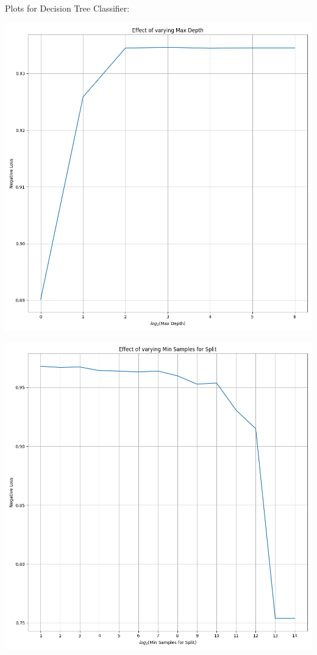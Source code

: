 \documentclass[12pt, letterpaper]{article}
\begin{document}
Plots for Decision Tree Classifier:

\includegraphics[scale=\myscale]{decision_tree_classifier_Max Depth.png}

\includegraphics[scale=\myscale]{decision_tree_classifier_Min Samples for Split.png}
\end{document}

